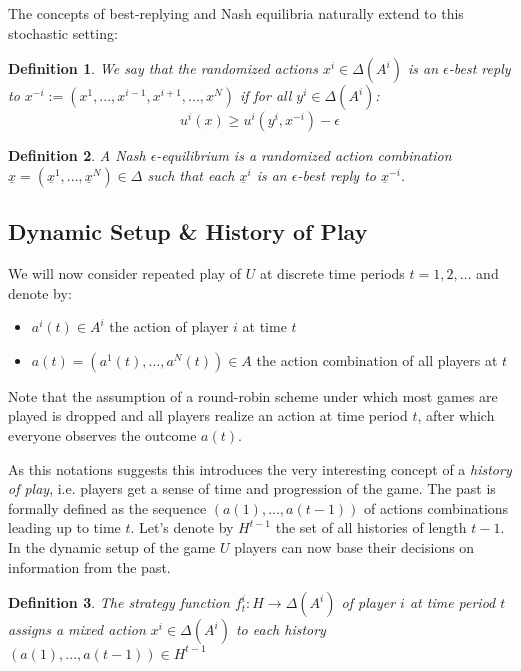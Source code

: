 \documentclass[a4paper]{article}
\theoremstyle{plain}
\newtheorem{definition}{Definition}
\theoremstyle{remark}
\newcommand{\eq}[1]{\underline{#1}}
\begin{document}
The concepts of best-replying and Nash equilibria naturally extend to this
stochastic setting:

\begin{definition}
    We say that the randomized actions $x^i \in \Delta(A^i)$ is an \emph{$\epsilon$-best reply}
    to $x^{-i} := (x^1, ..., x^{i-1}, x^{i+1}, ..., x^N)$ if for all $y^i \in \Delta(A^i)$:
    \[
        u^i(x) \geq u^i(y^i, x^{-i}) - \epsilon
    \]
\end{definition}

\begin{definition}
    A \emph{Nash $\epsilon$-equilibrium} is a randomized action combination $\eq{x} =
    (\eq{x}^1, ..., \eq{x}^N) \in \Delta$ such that each $\eq{x}^i$ is an $\epsilon$-best reply
    to $\eq{x}^{-i}$.
\end{definition}

\subsection{Dynamic Setup \& History of Play}

We will now consider repeated play of $U$ at discrete time periods $t = 1, 2,
...$ and denote by:
\begin{itemize}
    \item $a^i(t) \in A^i$ the action of player $i$ at time $t$
    \item $a(t) = (a^1(t), ..., a^N(t)) \in A$ the action combination of all players at $t$
\end{itemize}

Note that the assumption of a round-robin scheme under which most games are played
is dropped and
all players realize an action at time period $t$, after which everyone observes the
outcome $a(t)$.

As this notations suggests this introduces the very interesting concept of a
\emph{history of play}, i.e. players get a sense of time and progression of the game.
The past is formally
defined as the sequence $(a(1), ..., a(t-1))$ of actions combinations leading
up to time $t$. Let's denote by $H^{t-1}$ the set of all histories of length
$t-1$.
In the dynamic setup of the game $U$ players can now base their decisions on information from the
past.

\begin{definition}
    The \emph{strategy function} $f^i_t : H \to \Delta(A^i)$ of player $i$ at
    time period $t$ assigns a mixed action $x^i \in \Delta(A^i)$ to each history $(a(1),
    ..., a(t-1)) \in H^{t-1}$
\end{definition}
\end{document}

